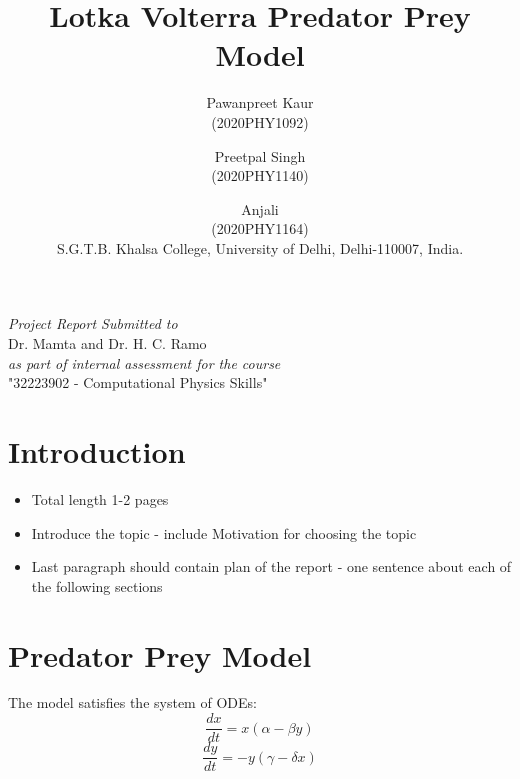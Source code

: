 \documentclass[12pt]{article}
\begin{document}
\baselineskip 0.7cm
\title{\bf \color{blue}Lotka Volterra Predator Prey Model }
\vskip 3cm
\author{Pawanpreet Kaur \\ (2020PHY1092) \and 
Preetpal Singh \\ (2020PHY1140) \and 
Anjali \\ (2020PHY1164) \\
{\color{blue}S.G.T.B. Khalsa College, University of
Delhi, Delhi-110007, India.} }

\maketitle
\vskip 4cm
\begin{center}
{\it {\color{blue}Project Report Submitted to}}\\
Dr. Mamta and Dr. H. C. Ramo \\
\textit{\color{blue}as part of internal assessment for the course}\\
 "32223902 - Computational Physics Skills"
\end{center}


\newpage

\newpage
\tableofcontents
\newpage

\section{Introduction}
\label{sec:intro}
\begin{itemize}
    \item Total length 1-2 pages
    \item Introduce the topic - include Motivation for choosing the topic 
    \item Last paragraph should contain plan of the report -
one sentence about each of the following sections
\end{itemize}
\section{Predator Prey Model}\cite{noauthor_lotkavolterra_nodate}
The model satisfies the
system of ODEs: \\
\begin{equation*}
\frac { d x } { d t } = x ( \alpha - \beta y )
\end{equation*}
\begin{equation*}
\frac { d y } { d t } = - y ( \gamma - \delta x )
\end{equation*}
\end{document}
